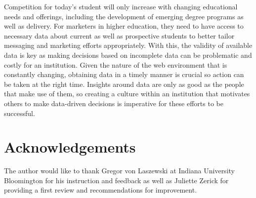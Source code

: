 \documentclass[sigconf]{acmart}
\begin{document}
Competition for today's student will only increase with changing educational needs and offerings, including the development of emerging degree programs as well as delivery. For marketers in higher education, they need to have access to necessary data about current as well as prospective students to better tailor messaging and marketing efforts appropriately. With this, the validity of available data is key as making decisions based on incomplete data can be problematic and costly for an institution. Given the nature of the web environment that is constantly changing, obtaining data in a timely manner is crucial so action can be taken at the right time. Insights around data are only as good as the people that make use of them, so creating a culture within an institution that motivates others to make data-driven decisions is imperative for these efforts to be successful.   

\section{Acknowledgements}

The author would like to thank Gregor von Laszewski at Indiana University Bloomington for his instruction and feedback as well as Juliette Zerick for providing a first review and recommendations for improvement. 





 
\end{document}
